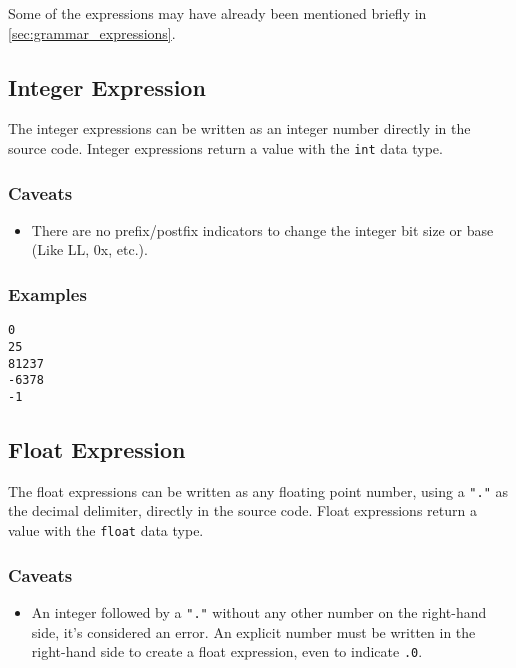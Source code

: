 Some of the expressions may have already been mentioned briefly in \autoref{sec:grammar_expressions}.

\subsection{Integer Expression}

The integer expressions can be written as an integer number directly in the source code.
Integer expressions return a value with the \texttt{int} data type.

\subsubsection{Caveats}

\begin{itemize}
    \item There are no prefix/postfix indicators to change the integer bit size or base (Like LL, 0x, etc.).
\end{itemize}

\subsubsection{Examples}

\begin{lstlisting}
0
25
81237
-6378
-1
\end{lstlisting}

\subsection{Float Expression}

The float expressions can be written as any floating point number, using a \texttt{"."} as the decimal delimiter, directly in the source code.
Float expressions return a value with the \texttt{float} data type.

\subsubsection{Caveats}

\begin{itemize}
    \item An integer followed by a \texttt{"."} without any other number on the right-hand side, it's considered an error. An explicit number
        must be written in the right-hand side to create a float expression, even to indicate \texttt{.0}.
\end{itemize}

